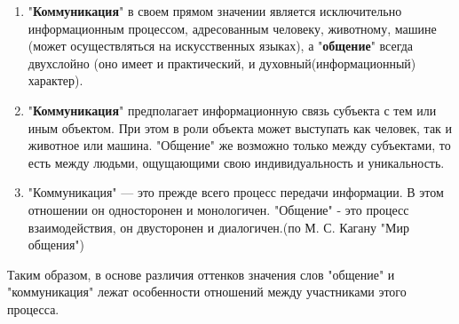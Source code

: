 \begin{enumerate}
    \item "\textbf{Коммуникация}" в своем прямом значении является исключительно информационным процессом, адресованным человеку, животному, машине (может осуществляться на искусственных языках), а "\textbf{общение}" всегда двухслойно (оно имеет и практический, и духовный(информационный) характер).
    \item "\textbf{Коммуникация}" предполагает информационную связь субъекта с тем или иным объектом. При этом в роли объекта может выступать как человек, так и животное или машина. "Общение" же возможно только между субъектами, то есть между людьми, ощущающими свою индивидуальность и уникальность.
    \item "Коммуникация" --- это прежде всего процесс передачи информации. В этом отношении он односторонен и монологичен. "Общение" - это процесс взаимодействия, он двусторонен и диалогичен.(по М. С. Кагану "Мир общения")
\end{enumerate}

Таким образом, в основе различия оттенков значения слов "общение" и
"коммуникация" лежат особенности отношений между участниками этого процесса.
